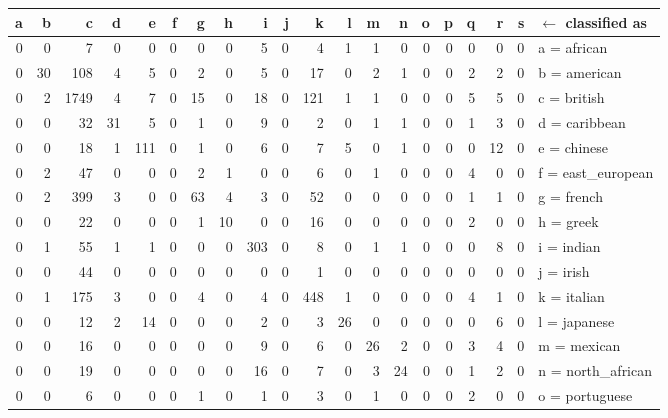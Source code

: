 \documentclass[11pt,a4paper]{article}
\begin{document}
\begin{sidewaystable}
  \centering
  \begin{tabular}{r r r r r r r r r r r r r r r r r r r | l}
    a&   b&   c&   d&   e&   f&   g&   h&   i&   j&   k&   l&   m&   n&   o&   p&   q&   r&   s& $\leftarrow$ classified as \\
    \hline
    0&   0&   7&   0&   0&   0&   0&   0&   5&   0&   4&   1&   1&   0&   0&   0&   0&   0&   0& a = african \\
    0&  30& 108&   4&   5&   0&   2&   0&   5&   0&  17&   0&   2&   1&   0&   0&   2&   2&   0& b = american \\
    0&   2&1749&   4&   7&   0&  15&   0&  18&   0& 121&   1&   1&   0&   0&   0&   5&   5&   0& c = british \\
    0&   0&  32&  31&   5&   0&   1&   0&   9&   0&   2&   0&   1&   1&   0&   0&   1&   3&   0& d = caribbean \\
    0&   0&  18&   1& 111&   0&   1&   0&   6&   0&   7&   5&   0&   1&   0&   0&   0&  12&   0& e = chinese \\
    0&   2&  47&   0&   0&   0&   2&   1&   0&   0&   6&   0&   1&   0&   0&   0&   4&   0&   0& f = east\_european \\
    0&   2& 399&   3&   0&   0&  63&   4&   3&   0&  52&   0&   0&   0&   0&   0&   1&   1&   0& g = french \\
    0&   0&  22&   0&   0&   0&   1&  10&   0&   0&  16&   0&   0&   0&   0&   0&   2&   0&   0& h = greek \\
    0&   1&  55&   1&   1&   0&   0&   0& 303&   0&   8&   0&   1&   1&   0&   0&   0&   8&   0& i = indian \\
    0&   0&  44&   0&   0&   0&   0&   0&   0&   0&   1&   0&   0&   0&   0&   0&   0&   0&   0& j = irish \\
    0&   1& 175&   3&   0&   0&   4&   0&   4&   0& 448&   1&   0&   0&   0&   0&   4&   1&   0& k = italian \\
    0&   0&  12&   2&  14&   0&   0&   0&   2&   0&   3&  26&   0&   0&   0&   0&   0&   6&   0& l = japanese \\
    0&   0&  16&   0&   0&   0&   0&   0&   9&   0&   6&   0&  26&   2&   0&   0&   3&   4&   0& m = mexican \\
    0&   0&  19&   0&   0&   0&   0&   0&  16&   0&   7&   0&   3&  24&   0&   0&   1&   2&   0& n = north\_african \\
    0&   0&   6&   0&   0&   0&   1&   0&   1&   0&   3&   0&   1&   0&   0&   0&   2&   0&   0& o = portuguese \\

\end{tabular}
\end{sidewaystable}
\end{document}
